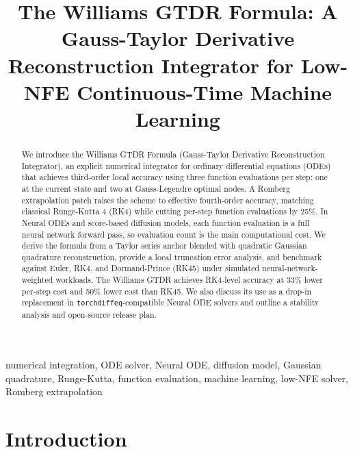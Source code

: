 \documentclass[conference]{IEEEtran}
\begin{document}
\title{The Williams GTDR Formula: A Gauss-Taylor Derivative Reconstruction
Integrator for Low-NFE Continuous-Time Machine Learning}

\author{
}

\maketitle

\begin{abstract}
We introduce the Williams GTDR Formula (Gauss-Taylor Derivative
Reconstruction Integrator), an explicit numerical integrator for
ordinary differential equations (ODEs) that achieves third-order local
accuracy using three function evaluations per step: one at the current
state and two at Gauss-Legendre optimal nodes. A Romberg extrapolation
patch raises the scheme to effective fourth-order accuracy, matching
classical Runge-Kutta 4 (RK4) while cutting per-step function
evaluations by 25\%. In Neural ODEs and score-based diffusion models,
each function evaluation is a full neural network forward pass, so
evaluation count is the main computational cost. We derive the formula
from a Taylor series anchor blended with quadratic Gaussian quadrature
reconstruction, provide a local truncation error analysis, and benchmark
against Euler, RK4, and Dormand-Prince (RK45) under simulated
neural-network-weighted workloads. The Williams GTDR achieves RK4-level
accuracy at 33\% lower per-step cost and 50\% lower cost than RK45.
We also discuss its use as a drop-in replacement in
\texttt{torchdiffeq}-compatible Neural ODE solvers and outline a
stability analysis and open-source release plan.
\end{abstract}

\begin{IEEEkeywords}
numerical integration, ODE solver, Neural ODE, diffusion model,
Gaussian quadrature, Runge-Kutta, function evaluation, machine learning,
low-NFE solver, Romberg extrapolation
\end{IEEEkeywords}

\section{Introduction}
\label{sec:intro}
\end{document}
